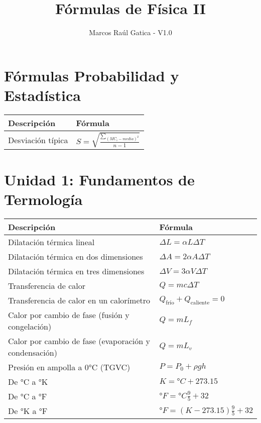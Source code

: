 \documentclass[a4paper,12pt]{article}
\title{Fórmulas de Física II}
\author{Marcos Raúl Gatica - V1.0}
\date{}
\begin{document}
	
	\maketitle
	\thispagestyle{fancy}
	\tableofcontents
	\newpage

	\section{Fórmulas Probabilidad y Estadística}
	\renewcommand{\arraystretch}{1.5}
	\begin{center}
		\begin{tabularx}{\textwidth}{|X|X|}
			\hline
			\textbf{Descripción} & \textbf{Fórmula} \\ \hline
			Desviación típica & $S = \sqrt{\frac{\sum_{(MC_i - media)^2}}{n-1}}$ \\ \hline
		\end{tabularx}
	\end{center}
	
	\section{Unidad 1: Fundamentos de Termología}
	\renewcommand{\arraystretch}{1.5} 
	\begin{center}
		\begin{tabularx}{\textwidth}{|X|X|}
			\hline
			\textbf{Descripción} & \textbf{Fórmula} \\ \hline
			Dilatación térmica lineal & $\Delta L = \alpha L \Delta T$ \\ \hline
			Dilatación térmica en dos dimensiones & $\Delta A = 2\alpha A \Delta T$ \\ \hline
			Dilatación térmica en tres dimensiones & $\Delta V = 3 \alpha V \Delta T$ \\ \hline
			Transferencia de calor & $Q = mc \Delta T$ \\ \hline
			Transferencia de calor en un calorímetro & $Q_{\text{frío}} + Q_{\text{caliente}} = 0$ \\ \hline
			Calor por cambio de fase (fusión y congelación) & $Q = mL_f$ \\ \hline
			Calor por cambio de fase (evaporación y condensación) & $Q = mL_v$ \\ \hline
			Presión en ampolla a 0°C (TGVC) & $P = {P_0} + \rho g h$ \\ \hline
			De °C a °K & $K = °C + 273.15$ \\ \hline
			De °C a °F & $°F = °C \frac{9}{5} + 32$ \\ \hline
			De °K a °F & $°F = (K - 273.15) \frac{9}{5} + 32$ \\ \hline
		\end{tabularx}
	\end{center}
	
\end{document}
